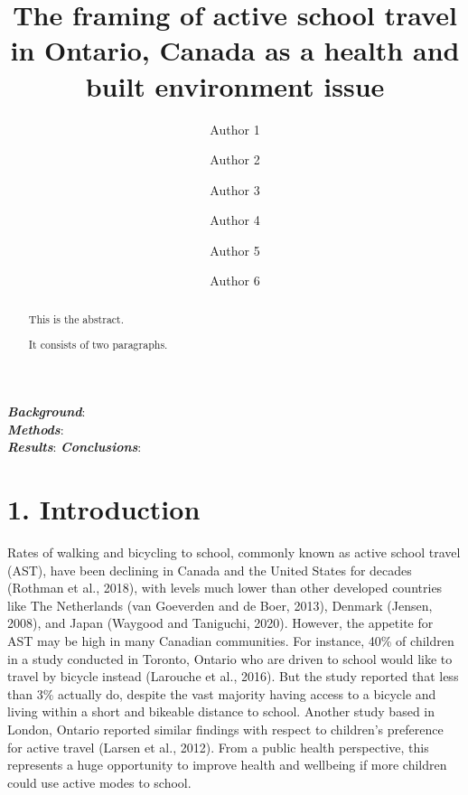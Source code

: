 \documentclass[]{elsarticle} %
\begin{document}
\begin{frontmatter}

  \title{The framing of active school travel in Ontario, Canada as a health and
built environment issue}
    \author[Some Department]{Author 1}
    \author[Some Department]{Author 2}
    \author[Another University]{Author 3}
    \author[Some Institute]{Author 4}
    \author[Some University]{Author 5}
    \author[Some Department]{Author 6}
      \address[Some Department]{Department, Street, City, Province, Postal Code}
    \address[Another University]{Department, Street, City, Province, Postal Code}
    \address[Some Institute]{Street, City, Province, Postal Code}
    \address[Some University]{Department, Street, City, Province, Postal Code}
  
  \begin{abstract}
  This is the abstract.
  
  It consists of two paragraphs.
  \end{abstract}
  
 \end{frontmatter}

\textbf{\emph{Background}}:\\
\textbf{\emph{Methods}}:\\
\textbf{\emph{Results}}: \textbf{\emph{Conclusions}}:

\newpage

\hypertarget{introduction}{%
\section{1. Introduction}\label{introduction}}

Rates of walking and bicycling to school, commonly known as active
school travel (AST), have been declining in Canada and the United States
for decades (Rothman et al., 2018), with levels much lower than other
developed countries like The Netherlands (van Goeverden and de Boer,
2013), Denmark (Jensen, 2008), and Japan (Waygood and Taniguchi, 2020).
However, the appetite for AST may be high in many Canadian communities.
For instance, 40\% of children in a study conducted in Toronto, Ontario
who are driven to school would like to travel by bicycle instead
(Larouche et al., 2016). But the study reported that less than 3\%
actually do, despite the vast majority having access to a bicycle and
living within a short and bikeable distance to school. Another study
based in London, Ontario reported similar findings with respect to
children's preference for active travel (Larsen et al., 2012). From a
public health perspective, this represents a huge opportunity to improve
health and wellbeing if more children could use active modes to school.
\end{document}
